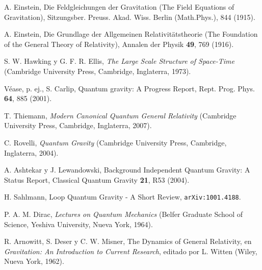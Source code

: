 \cleardoublepage{}

\begin{thebibliography}{999}



 A. Einstein, Die Feldgleichungen der Gravitation (The Field Equations of
Gravitation), Sitzungsber. Preuss. Akad. Wiss. Berlin (Math.Phys.), 844 (1915).

 A. Einstein, Die Grundlage der
Allgemeinen Relativitätstheorie (The Foundation of the General Theory of Relativity), Annalen der
Physik {\bf49}, 769 (1916).

 S. W. Hawking y G. F. R. Ellis, {\it The Large Scale Structure of Space-Time}
(Cambridge University Press, Cambridge, Inglaterra, 1973).

 Véase, p. ej., S. Carlip, Quantum gravity: A Progress Report,
Rept. Prog. Phys. {\bf64}, 885 (2001).

 T. Thiemann, {\it{Modern Canonical Quantum General Relativity}} (Cambridge University
Press, Cambridge, Inglaterra, 2007).

 C. Rovelli, {\it{Quantum Gravity}} (Cambridge University Press, Cambridge,
Inglaterra,
2004).

 A. Ashtekar y J. Lewandowski, Background Independent Quantum Gravity: A Status
Report, Classical Quantum Gravity {\bf 21}, R53 (2004).

 H. Sahlmann, Loop Quantum Gravity - A Short Review, \texttt{arXiv:1001.4188}. 

 P. A. M. Dirac, {\it Lectures on Quantum Mechanics} (Belfer
Graduate School of Science, Yeshiva University, Nueva York, 1964).

 R. Arnowitt, S. Deser y  C. W. Misner, The Dynamics of General Relativity,
en {\it Gravitation: An Introduction to Current Research}, editado por L. Witten (Wiley, Nueva
York, 1962).


\end{thebibliography}
